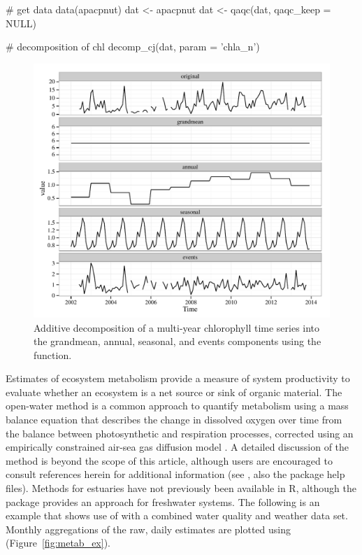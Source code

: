 \begin{example}
# get data
data(apacpnut)
dat <- apacpnut
dat <- qaqc(dat, qaqc_keep = NULL)

# decomposition of chl
decomp_cj(dat, param = 'chla_n')
\end{example}
\begin{figure}[!h]

{\centering \includegraphics[width=\textwidth]{decomp_ex2-1} 

}

\caption[Additive decomposition of a multi-year chlorophyll time series into the grandmean, annual, seasonal, and events components using the  function]{Additive decomposition of a multi-year chlorophyll time series into the grandmean, annual, seasonal, and events components using the  function.}\label{fig:decomp_ex2}
\end{figure}

Estimates of ecosystem metabolism provide a measure of system productivity to evaluate whether an ecosystem is a net source or sink of organic material.  The open-water method \citep{Odum56} is a common approach to quantify metabolism using a mass balance equation that describes the change in dissolved oxygen over time from the balance between photosynthetic and respiration processes, corrected using an empirically constrained air-sea gas diffusion model \citep{Ro06,Thebault08}. A detailed discussion of the method is beyond the scope of this article, although users are encouraged to consult references herein for additional information (see \citet{Kemp12,Needoba12,Caffrey14}, also the package help files).  Methods for estuaries have not previously been available in R, although the  package provides an approach for freshwater systems.  The following is an example that shows use of  with a combined water quality and weather data set.  Monthly aggregations of the raw, daily estimates are plotted using  (Figure~\ref{fig:metab_ex}).

